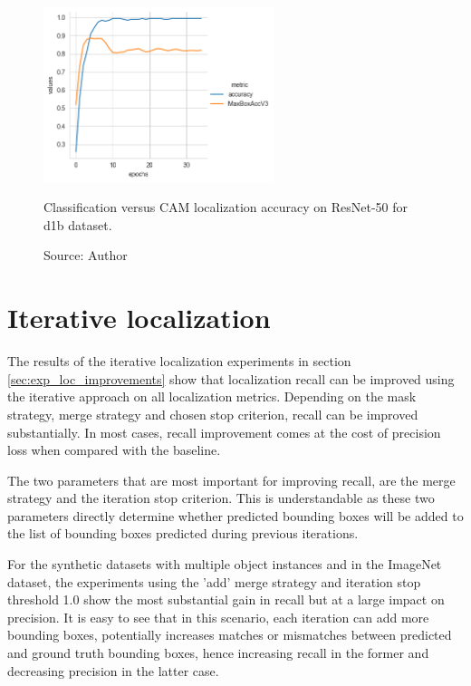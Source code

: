 \begin{figure}[ht]
\begin{center}
    \includegraphics[width=0.6\textwidth]{images/fig_loc_vs_acc_resnet50_cam_d1b.png}
    \caption[Classification versus CAM localization accuracy on ResNet-50 for d1b dataset]{Classification versus CAM localization accuracy on ResNet-50 for d1b dataset.}
    \caption*{Source: Author}
    \label{fig:loc_vs_acc_resnet50_cam_d1b}
\end{center}
\end{figure}

\section{Iterative localization} \label{dis:iterative_localizaiton}
The results of the iterative localization experiments in section \ref{sec:exp_loc_improvements} show that localization recall can be improved using the iterative approach on all localization metrics. Depending on the mask strategy, merge strategy and chosen stop criterion, recall can be improved substantially. In most cases, recall improvement comes at the cost of precision loss when compared with the baseline.

The two parameters that are most important for improving recall, are the merge strategy and the iteration stop criterion. This is understandable as these two parameters directly determine whether predicted bounding boxes will be added to the list of bounding boxes predicted during previous iterations. 

For the synthetic datasets with multiple object instances and in the ImageNet dataset, the experiments using the 'add' merge strategy and iteration stop threshold 1.0 show the most substantial gain in recall but at a large impact on precision. It is easy to see that in this scenario, each iteration can add more bounding boxes, potentially increases matches or mismatches between predicted and ground truth bounding boxes, hence increasing recall in the former and decreasing precision in the latter case.

